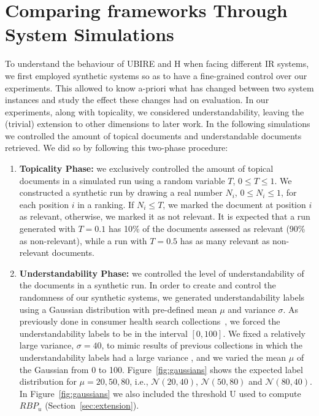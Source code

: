 



\section{Comparing frameworks Through System Simulations}
\label{sec:simulations}

To understand the behaviour of UBIRE and H when facing different IR systems, we first employed synthetic systems so as to have a fine-grained control over our experiments. This allowed to know a-priori what has changed between two system instances and study the effect these changes had on evaluation. In our experiments, along with topicality, we considered understandability, leaving the (trivial) extension to other dimensions to later work. 
In the following simulations we controlled the amount of topical documents and understandable documents retrieved. We did so by following this two-phase procedure:

\begin{enumerate}
\item \textbf{Topicality Phase:} we exclusively controlled the amount of topical documents in a simulated run using a random variable $T$, $0 \le T \le 1$. 
We constructed a synthetic run by drawing a real number $N_i$, $0 \le N_i \le 1$, for each position $i$ in a ranking. If $N_i \le T$, we marked the document at position $i$ as relevant, otherwise, we marked it as not relevant. It is expected that a run generated with $T=0.1$ has 10\% of the documents assessed as relevant (90\% as non-relevant), while a run with $T=0.5$ has as many relevant as non-relevant documents. 

\item \textbf{Understandability Phase:}  we controlled the level of understandability of the documents in a synthetic run. In order to create and control the randomness of our synthetic systems, we generated understandability labels using a Gaussian distribution with pre-defined mean $\mu$ and variance $\sigma$. 
As previously done in consumer health search collections~\cite{clefIR16,clefIR17}, we forced the understandability labels to be in the interval $[0,100]$. 
We fixed a relatively large variance, $\sigma=40$, to mimic results of previous collections in which the understandability labels had a large variance \cite{clefIR16}, and we varied the mean $\mu$ of the Gaussian from 0 to 100. Figure~\ref{fig:gaussians} shows the expected label distribution for $\mu=20, 50, 80$, i.e., $\mathcal{N}(20, 40)$, $\mathcal{N}(50, 80)$ and $\mathcal{N}(80, 40)$.
In Figure~\ref{fig:gaussians} we also included the threshold U used to compute $RBP_u$ (Section~\ref{sec:extension}).
\end{enumerate}

